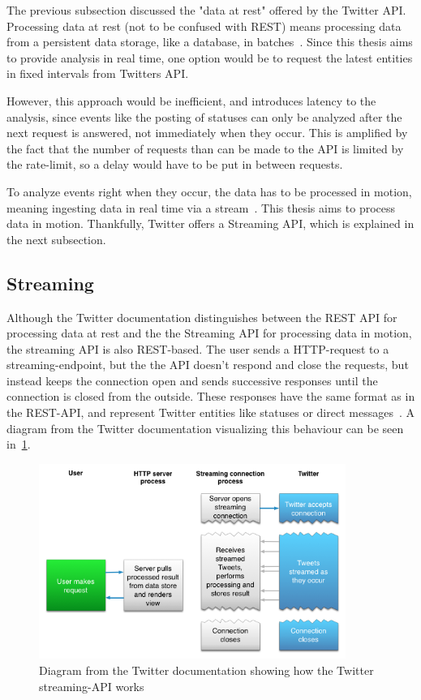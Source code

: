 The previous subsection discussed the "data at rest" offered by the Twitter API.
Processing data at rest (not to be confused with REST) means processing data from a persistent data storage, like a database, in batches~\cite{Nandi2015}.
Since this thesis aims to provide analysis in real time, one option would be to request the latest entities in fixed intervals from
Twitters API.
\par
However, this approach would be inefficient, and introduces latency to the analysis,
since events like the posting of statuses can only be analyzed after the next request is answered, not immediately when they occur.
This is amplified by the fact that the number of requests than can be made to the API is limited by the rate-limit,
so a delay would have to be put in between requests.
\par
To analyze events right when they occur, the data has to be processed in motion, meaning ingesting data in real time via a stream~\cite{Nandi2015}.
This thesis aims to process data in motion.
Thankfully, Twitter offers a Streaming API, which is explained in the next subsection.


\subsection{Streaming}
\label{subsec:streaming}

Although the Twitter documentation distinguishes between the REST API for processing data at rest and the the Streaming API for processing data in motion,
the streaming API is also REST-based.
The user sends a HTTP-request to a streaming-endpoint, but the the API doesn't respond and close the requests,
but instead keeps the connection open and sends successive responses until the connection is closed from the outside.
These responses have the same format as in the REST-API, and represent Twitter entities like statuses or direct messages~\cite{twitterDocs}.
A diagram from the Twitter documentation visualizing this behaviour can be seen in~\ref{fig:twitter_streaming}.

\begin{figure}
    \centering
    \caption{Diagram from the Twitter documentation showing how the Twitter streaming-API works~\cite{twitterDocs}}
    \label{fig:twitter_streaming}
    \includegraphics[width=10cm]{../images/twitter_streaming_diagram.png}
\end{figure}

